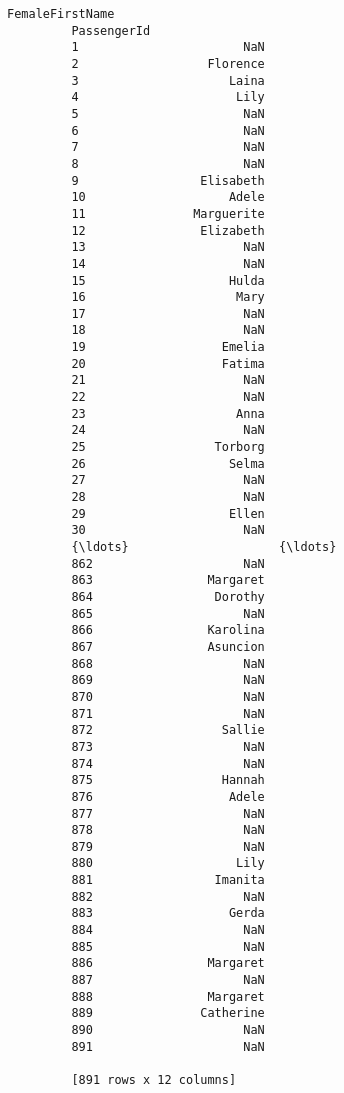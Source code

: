 \documentclass[11pt]{article}
\begin{document}
\begin{Verbatim}[commandchars=\\\{\}]
                     FemaleFirstName  
         PassengerId                  
         1                       NaN  
         2                  Florence  
         3                     Laina  
         4                      Lily  
         5                       NaN  
         6                       NaN  
         7                       NaN  
         8                       NaN  
         9                 Elisabeth  
         10                    Adele  
         11               Marguerite  
         12                Elizabeth  
         13                      NaN  
         14                      NaN  
         15                    Hulda  
         16                     Mary  
         17                      NaN  
         18                      NaN  
         19                   Emelia  
         20                   Fatima  
         21                      NaN  
         22                      NaN  
         23                     Anna  
         24                      NaN  
         25                  Torborg  
         26                    Selma  
         27                      NaN  
         28                      NaN  
         29                    Ellen  
         30                      NaN  
         {\ldots}                     {\ldots}  
         862                     NaN  
         863                Margaret  
         864                 Dorothy  
         865                     NaN  
         866                Karolina  
         867                Asuncion  
         868                     NaN  
         869                     NaN  
         870                     NaN  
         871                     NaN  
         872                  Sallie  
         873                     NaN  
         874                     NaN  
         875                  Hannah  
         876                   Adele  
         877                     NaN  
         878                     NaN  
         879                     NaN  
         880                    Lily  
         881                 Imanita  
         882                     NaN  
         883                   Gerda  
         884                     NaN  
         885                     NaN  
         886                Margaret  
         887                     NaN  
         888                Margaret  
         889               Catherine  
         890                     NaN  
         891                     NaN  
         
         [891 rows x 12 columns]
\end{Verbatim}
            
\end{document}
